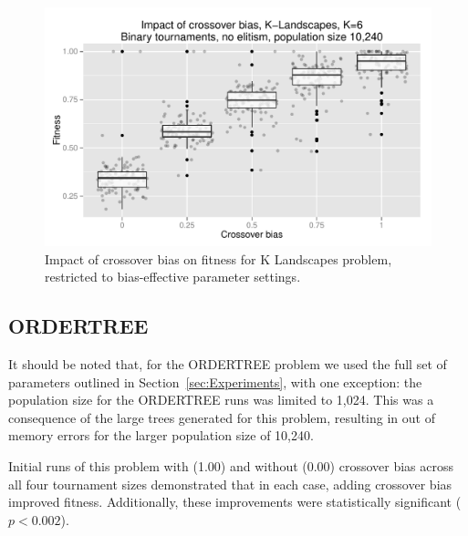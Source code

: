\documentclass{sig-alternate}
\begin{document}
\begin{figure}
\centering
\includegraphics[width=0.45 \textwidth]{Plots/KLandscapes6_XO_bias_strong_impact_alpha_075.pdf}
\caption{Impact of crossover bias on fitness for K Landscapes problem, restricted to bias-effective parameter settings.}
\label{fig:KLandscapes6_strong_results}
\end{figure}

%
%
%
%

%
%
%
%

\subsection{ORDERTREE}

It should be noted that, for the ORDERTREE problem we used the full set of parameters outlined in
Section~\ref{sec:Experiments}, with one exception: the population size for the ORDERTREE 
runs was limited to 1,024.
This was a consequence of the large trees generated for this problem, resulting in out of memory errors for the larger
population size of 10,240.

Initial runs of this problem with (1.00) and without (0.00) crossover bias across all four tournament sizes
demonstrated that in each case, adding crossover bias improved fitness. Additionally, these improvements were
statistically significant ($p < 0.002$).
\end{document}

